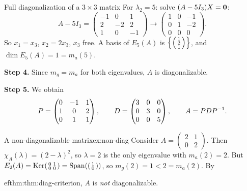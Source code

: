 \begin{example}{Full diagonalization of a $3\times 3$ matrix}
For $\lambda_2 = 5$: solve $(A - 5I_3)X = \mathbf{0}$:
\[
  A - 5I_3 = \begin{pmatrix} -1 & 0 & 1 \\ 2 & -2 & 2 \\ 1 & 0 & -1
  \end{pmatrix} \longrightarrow \begin{pmatrix} 1 & 0 & -1 \\ 0 & 1 & -2
  \\ 0 & 0 & 0 \end{pmatrix}.
\]
So $x_1 = x_3$, $x_2 = 2x_3$, $x_3$ free.  A basis of $E_5(A)$ is
$\left\{ \begin{psmallmatrix} 1\\2\\1 \end{psmallmatrix} \right\}$,
and $\dim E_5(A) = 1 = m_a(5)$.

\textbf{Step 4.}  Since $m_g = m_a$ for both eigenvalues, $A$ is
diagonalizable.

\textbf{Step 5.}  We obtain
\[
  P = \begin{pmatrix} 0 & -1 & 1 \\ 1 & 0 & 2 \\ 0 & 1 & 1
  \end{pmatrix}, \qquad
  D = \begin{pmatrix} 3 & 0 & 0 \\ 0 & 3 & 0 \\ 0 & 0 & 5
  \end{pmatrix}, \qquad
  A = P D {P}^{-1}.
\]
\end{example}

\begin{example}{A non-diagonalizable matrix}{ex:non-diag}
Consider $A = \begin{pmatrix} 2 & 1 \\ 0 & 2 \end{pmatrix}$.  Then
$\chi_A(\lambda) = (2-\lambda)^2$, so $\lambda = 2$ is the only
eigenvalue with $m_a(2) = 2$.  But
$E_2(A) = \operatorname{Ker}\begin{psmallmatrix} 0 & 1 \\ 0 & 0 \end{psmallmatrix}
= \operatorname{Span}\!\left(\begin{psmallmatrix} 1 \\ 0 \end{psmallmatrix}\right)$,
so $m_g(2) = 1 < 2 = m_a(2)$.  By

ef{thm:thm:diag-criterion}, $A$ is \emph{not} diagonalizable.
\end{example}


